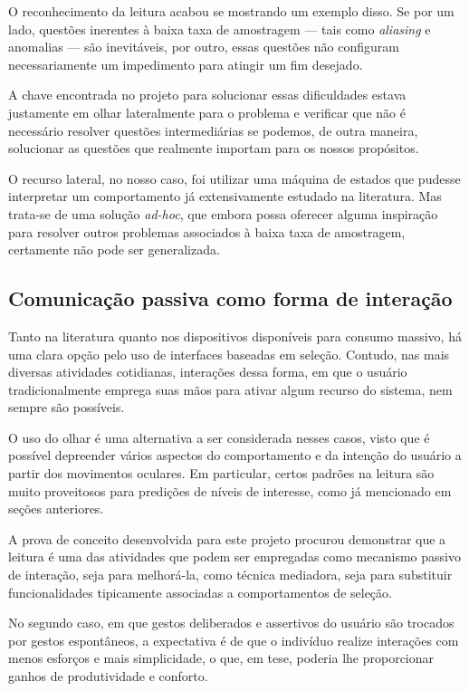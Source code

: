 \documentclass[12pt]{article}
\begin{document}
		O reconhecimento da leitura acabou se mostrando um exemplo disso. Se por um lado, questões inerentes à baixa taxa de amostragem --- tais como \textit{aliasing} e anomalias --- são inevitáveis, por outro, essas questões não configuram necessariamente um impedimento para atingir um fim desejado.
		
		A chave encontrada no projeto para solucionar essas dificuldades estava justamente em olhar lateralmente para o problema e verificar que não é necessário resolver questões intermediárias se podemos, de outra maneira, solucionar as questões que realmente importam para os nossos propósitos.
		
		O recurso lateral, no nosso caso, foi utilizar uma máquina de estados que pudesse interpretar um comportamento já extensivamente estudado na literatura. Mas trata-se de uma solução \textit{ad-hoc}, que embora possa oferecer alguma inspiração para resolver outros problemas associados à baixa taxa de amostragem, certamente não pode ser generalizada.
		
		\subsection{Comunicação passiva como forma de interação}
		Tanto na literatura quanto nos dispositivos disponíveis para consumo massivo, há uma clara opção pelo uso de interfaces baseadas em seleção. Contudo, nas mais diversas atividades cotidianas, interações dessa forma, em que o usuário tradicionalmente emprega suas mãos para ativar algum recurso do sistema, nem sempre são possíveis.
		
		O uso do olhar é uma alternativa a ser considerada nesses casos, visto que é possível depreender vários aspectos do comportamento e da intenção do usuário a partir dos movimentos oculares. Em particular, certos padrões na leitura são muito proveitosos para predições de níveis de interesse, como já mencionado em seções anteriores.
		
		A prova de conceito desenvolvida para este projeto procurou demonstrar que a leitura é uma das atividades que podem ser empregadas como mecanismo passivo de interação, seja para melhorá-la, como técnica mediadora, seja para substituir funcionalidades tipicamente associadas a comportamentos de seleção.
		
		No segundo caso, em que gestos deliberados e assertivos do usuário são trocados por gestos espontâneos, a expectativa é de que o indivíduo realize interações com menos esforços e mais simplicidade, o que, em tese, poderia lhe proporcionar ganhos de produtividade e conforto.
		
\end{document}

